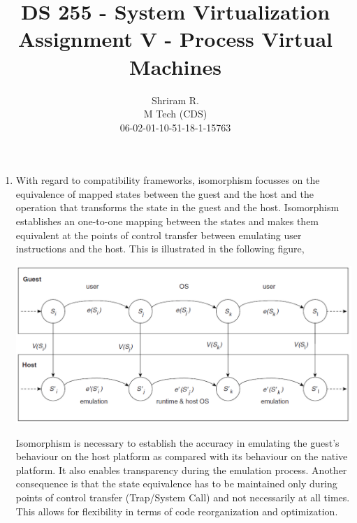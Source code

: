 \documentclass[11pt,a4paper,oneside]{article}
\begin{document}
	\title{DS 255 - System Virtualization \\ Assignment V - Process Virtual Machines}
	\author{Shriram R. \\ M Tech (CDS) \\ 06-02-01-10-51-18-1-15763}
	\maketitle	
	
	\begin{enumerate}
		\item With regard to compatibility frameworks, isomorphism focusses on the equivalence of mapped states between the guest and the host and the operation that transforms the state in the guest and the host. Isomorphism establishes an one-to-one mapping between the states and makes them equivalent at the points of control transfer between emulating user instructions and the host. This is illustrated in the following figure,		
				\begin{center}
				   \includegraphics[scale=0.4]{1.png}
				\end{center}
		Isomorphism is necessary to establish the accuracy in emulating the guest's behaviour on the host platform as compared with its behaviour on the native platform. It also enables transparency during the emulation process. Another consequence is that the state equivalence has to be maintained only during points of control transfer (Trap/System Call) and not necessarily at all times. This allows for flexibility in terms of code reorganization and optimization. 
		

\end{enumerate}
\end{document}
